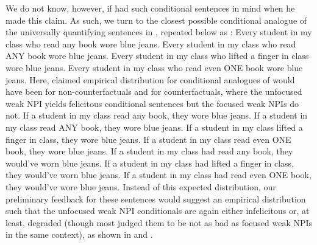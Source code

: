 We do not know, however, if \textcite{Crnic2014-dogma} had such conditional sentences in mind when he made this claim. As such, we turn to the closest possible conditional analogue of the universally quantifying sentences in , repeated below as :
\pex[nopreamble=true]\label{ex:npi-every-bad-condch}%
\a{} Every student in my class who read any book wore blue jeans.
\a{}\ljudge{\#} Every student in my class who read \MakeUppercase{any} book wore blue jeans.
\a{}\ljudge{\#} Every student in my class who lifted a finger in class wore blue jeans.
\a{}\ljudge{\#} Every student in my class who read even \MakeUppercase{one} book wore blue jeans.
\xe
Here,  claimed empirical distribution for conditional analogues of  would have been  for non-counterfactuals and  for counterfactuals, where the unfocused weak NPI yields felicitous conditional sentences but the focused weak NPIs do not.
\pex[nopreamble=true]\label{ex:npi-every-bad-analogue}%
\a{}\ljudge{} If a student in my class read any book, they wore blue jeans.
\a{}\ljudge{\#} If a student in my class read \MakeUppercase{any} book, they wore blue jeans.
\a{}\ljudge{\#} If a student in my class lifted a finger in class, they wore blue jeans.
\a{}\ljudge{\#} If a student in my class read even \MakeUppercase{one} book, they wore blue jeans.
\xe
\pex[nopreamble=true]\label{ex:npi-every-bad-analogue2}%
\a{}\ljudge{} If a student in my class had read any book, they would've worn blue jeans.
\a{}\ljudge{\#} 
\a{}\ljudge{\#} If a student in my class had lifted a finger in class, they would've worn blue jeans.
\a{}\ljudge{\#} If a student in my class had read even \MakeUppercase{one} book, they would've wore blue jeans.
\xe
Instead of this expected distribution, our preliminary feedback for these sentences would suggest an empirical distribution such that the unfocused weak NPI conditionals are again either infelicitous or, at least, degraded (though most judged them to be not as bad as focused weak NPIs in the same context), as shown in  and .
\pex[nopreamble=true]\label{ex:npi-every-bad-analogue3}%

